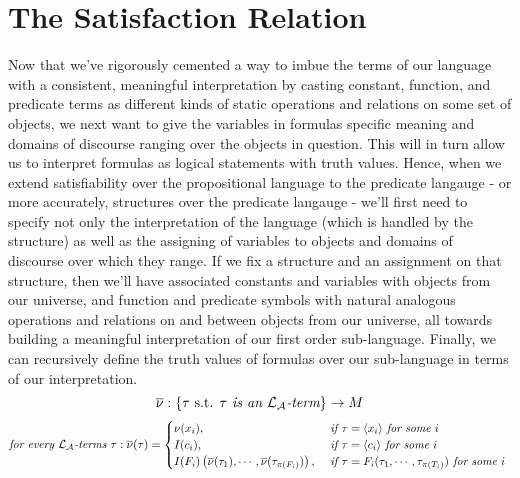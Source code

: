 \documentclass{article}
\begin{document}
\section{The Satisfaction Relation}
Now that we've rigorously cemented a way to imbue the terms of our language with a consistent, meaningful interpretation by casting constant, function, and predicate terms as different kinds of static operations and relations on some set of objects, we next want to give the variables in formulas specific meaning and domains of discourse ranging over the objects in question. This will in turn allow us to interpret formulas as logical statements with truth values. Hence, when we extend satisfiability over the propositional language to the predicate langauge - or more accurately, structures over the predicate langauge - we'll first need to specify not only the interpretation of the language (which is handled by the structure) as well as the assigning of variables to objects and domains of discourse over which they range.
If we fix a structure and an assignment on that structure, then we'll have associated constants and variables with objects from our universe, and function and predicate symbols with natural analogous operations and relations on and between objects from our universe, all towards building a meaningful interpretation of our first order sub-language. Finally, we can recursively define the truth values of formulas over our sub-language in terms of our interpretation.
    $$ \overline{\nu}: \{ \tau \textnormal{ s.t. } \textit{$ \tau $ is an $ \mathcal{L}_{\mathcal{A}} $-term} \} \rightarrow M $$
    $$ \textit{for every $ \mathcal{L}_{\mathcal{A}} $-terms } \tau: \overline{\nu}(\tau) = \begin{cases}
        \nu(x_i), &\textit{ if } \tau = \langle x_i \rangle \textit{ for some $ i $ } \\
        I(c_i), &\textit{ if } \tau = \langle c_i \rangle \textit{ for some $ i $ } \\
        I(F_i) \left(\overline{\nu}(\tau_1), \cdots, \overline{\nu}(\tau_{\pi(F_i)}) \right), &\textit{ if } \tau = F_i(\tau_1, \cdots, \tau_{\pi(T_i)}) \textit{ for some $ i $ }
    \end{cases} $$
\end{document}
